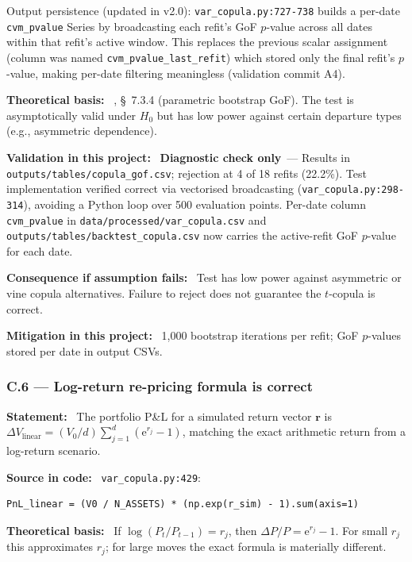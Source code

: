 \documentclass[11pt,a4paper]{article}
\newcommand{\asmfield}[1]{\medskip\noindent\textbf{#1:}\ }
\newcommand{\code}[1]{\texttt{#1}}
\newcommand{\diagnostic}{\textbf{Diagnostic check only}}
\begin{document}
Output persistence (updated in v2.0): \code{var\_copula.py:727-738} builds
a per-date \code{cvm\_pvalue} Series by broadcasting each refit's GoF
$p$-value across all dates within that refit's active window.  This replaces
the previous scalar assignment (column was named \code{cvm\_pvalue\_last\_refit})
which stored only the final refit's $p$-value, making per-date filtering
meaningless (validation commit A4).

\asmfield{Theoretical basis}
\cite{McNeilFreyEmbrechts2005}, \S~7.3.4 (parametric bootstrap GoF).
The test is asymptotically valid under $H_0$ but has low power against
certain departure types (e.g., asymmetric dependence).

\asmfield{Validation in this project}
\diagnostic\ --- Results in \code{outputs/tables/copula\_gof.csv};
rejection at 4 of 18 refits (22.2\%). Test implementation verified correct
via vectorised broadcasting (\code{var\_copula.py:298-314}), avoiding a
Python loop over 500 evaluation points.  Per-date column \code{cvm\_pvalue}
in \code{data/processed/var\_copula.csv} and \code{outputs/tables/backtest\_copula.csv}
now carries the active-refit GoF $p$-value for each date.

\asmfield{Consequence if assumption fails}
Test has low power against asymmetric or vine copula alternatives. Failure
to reject does not guarantee the $t$-copula is correct.

\asmfield{Mitigation in this project}
1{,}000 bootstrap iterations per refit; GoF $p$-values stored per date
in output CSVs.

\subsubsection{C.6 --- Log-return re-pricing formula is correct}\label{asm:C6}

\asmfield{Statement}
The portfolio P\&L for a simulated return vector $\mathbf{r}$ is
$\Delta V_{\text{linear}} = (V_0/d) \sum_{j=1}^{d}(\mathrm{e}^{r_j} - 1)$,
matching the exact arithmetic return from a log-return scenario.

\asmfield{Source in code}
\code{var\_copula.py:429}:
\begin{lstlisting}
PnL_linear = (V0 / N_ASSETS) * (np.exp(r_sim) - 1).sum(axis=1)
\end{lstlisting}

\asmfield{Theoretical basis}
If $\log(P_t/P_{t-1}) = r_j$, then $\Delta P / P = \mathrm{e}^{r_j} - 1$.
For small $r_j$ this approximates $r_j$; for large moves the exact formula
is materially different.
\end{document}
